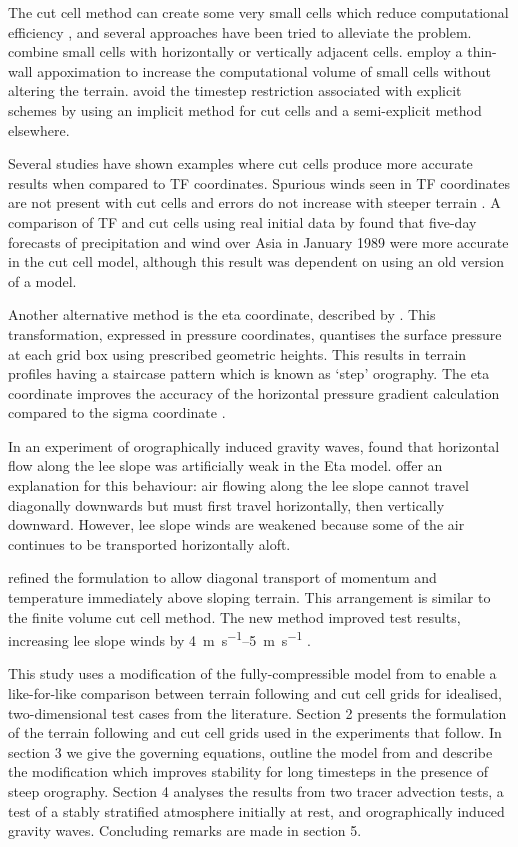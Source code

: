 \documentclass{ametsoc}
\begin{document}
The cut cell method can create some very small cells which reduce computational efficiency \citep{klein2009}, and several approaches have been tried to alleviate the problem.  \citet{yamazaki-satomura2010} combine small cells with horizontally or vertically adjacent cells.  \citet{steppeler2002} employ a thin-wall appoximation to increase the computational volume of small cells without altering the terrain.  \citet{jebens2011} avoid the timestep restriction associated with explicit schemes by using an implicit method for cut cells and a semi-explicit method elsewhere.

Several studies have shown examples where cut cells produce more accurate results when compared to TF coordinates.  Spurious winds seen in TF coordinates are not present with cut cells and errors do not increase with steeper terrain \citep{good2014}.  A comparison of TF and cut cells using real initial data by \citet{steppeler2013} found that five-day forecasts of precipitation and wind over Asia in January 1989 were more accurate in the cut cell model, although this result was dependent on using an old version of a model.

Another alternative method is the eta coordinate, described by \citet{mesinger1988}.  This transformation, expressed in pressure coordinates, quantises the surface pressure at each grid box using prescribed geometric heights.  This results in terrain profiles having a staircase pattern which is known as `step' orography.  The eta coordinate improves the accuracy of the horizontal pressure gradient calculation compared to the sigma coordinate \citep{mesinger1988}.

In an experiment of orographically induced gravity waves, \citet{gallus-klemp2000} found that horizontal flow along the lee slope was artificially weak in the Eta model.  \citet{mesinger2012} offer an explanation for this behaviour: air flowing along the lee slope cannot travel diagonally downwards but must first travel horizontally, then vertically downward.  However, lee slope winds are weakened because some of the air continues to be transported horizontally aloft.

\citet{mesinger2012} refined the formulation to allow diagonal transport of momentum and temperature immediately above sloping terrain.  This arrangement is similar to the finite volume cut cell method.  The new method improved test results, increasing lee slope winds by \SIrange{4}{5}{\meter\per\second} \citep{mesinger2012}.

This study uses a modification of the fully-compressible model from \citet{weller-shahrokhi2014} to enable a like-for-like comparison between terrain following and cut cell grids for idealised, two-dimensional test cases from the literature.  Section 2 presents the formulation of the terrain following and cut cell grids used in the experiments that follow.  In section 3 we give the governing equations, outline the model from \citet{weller-shahrokhi2014} and describe the modification which improves stability for long timesteps in the presence of steep orography.  Section 4 analyses the results from two tracer advection tests, a test of a stably stratified atmosphere initially at rest, and orographically induced gravity waves.  Concluding remarks are made in section 5.
\end{document}

